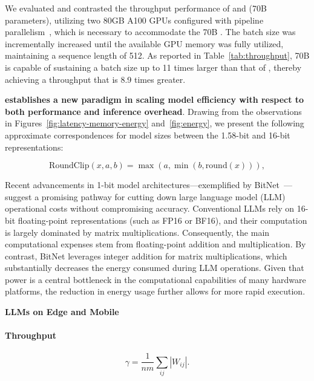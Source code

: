 We evaluated and contrasted the throughput performance of  and  (70B parameters), utilizing two 80GB A100 GPUs configured with pipeline parallelism~\cite{gpipe}, which is necessary to accommodate the 70B . The batch size was incrementally increased until the available GPU memory was fully utilized, maintaining a sequence length of 512. As reported in Table~\ref{tab:throughput},  70B is capable of sustaining a batch size up to 11 times larger than that of , thereby achieving a throughput that is 8.9 times greater.

\textbf{ establishes a new paradigm in scaling model efficiency with respect to both performance and inference overhead}. Drawing from the observations in Figures~\ref{fig:latency-memory-energy} and~\ref{fig:energy}, we present the following approximate correspondences for model sizes between the 1.58-bit and 16-bit representations:

\begin{equation}
    \mathrm{RoundClip}(x, a, b) = \max(a, \min(b, \mathrm{round}(x))),
\end{equation}

Recent advancements in 1-bit model architectures—exemplified by BitNet~\cite{bitnet}—suggest a promising pathway for cutting down large language model (LLM) operational costs without compromising accuracy. Conventional LLMs rely on 16-bit floating-point representations (such as FP16 or BF16), and their computation is largely dominated by matrix multiplications. Consequently, the main computational expenses stem from floating-point addition and multiplication. By contrast, BitNet leverages integer addition for matrix multiplications, which substantially decreases the energy consumed during LLM operations. Given that power is a central bottleneck in the computational capabilities of many hardware platforms, the reduction in energy usage further allows for more rapid execution.

\textbf{LLMs on Edge and Mobile}

\paragraph{Throughput}

\begin{equation}
    \gamma = \frac{1}{nm}\sum_{ij} |W_{ij}|.
\end{equation}

